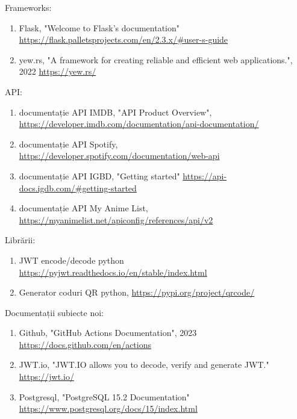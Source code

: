 \documentclass{article}
\begin{document}
\noindent Frameworks:
\begin{enumerate}[noitemsep, leftmargin=0.3cm]
    \item Flask, "Welcome to Flask’s documentation" \href{https://flask.palletsprojects.com/en/2.3.x/#user-s-guide}{https://flask.palletsprojects.com/en/2.3.x/\#user-s-guide}
    \item yew.rs, "A framework for creating reliable and efficient web applications.", 2022 \href{https://yew.rs/}{https://yew.rs/}
\end{enumerate}

\noindent API:
\begin{enumerate}[noitemsep, leftmargin=0.3cm]
\item documentație API IMDB, "API Product Overview", \href{https://developer.imdb.com/documentation/api-documentation/}{https://developer.imdb.com/documentation/api-documentation/} 
    \item documentație API Spotify, \href{https://developer.spotify.com/documentation/web-api}{https://developer.spotify.com/documentation/web-api}
    \item documentație API IGBD, "Getting started" \href{https://api-docs.igdb.com/#getting-started}{https://api-docs.igdb.com/\#getting-started}
    \item documentație API My Anime List, \href{https://myanimelist.net/apiconfig/references/api/v2}{https://myanimelist.net/apiconfig/references/api/v2}
\end{enumerate}

\noindent Librării:
\begin{enumerate}[noitemsep, leftmargin=0.3cm]
    \item JWT encode/decode python \href{https://pyjwt.readthedocs.io/en/stable/index.html}{https://pyjwt.readthedocs.io/en/stable/index.html}
    \item Generator coduri QR python, \href{https://pypi.org/project/qrcode/}{https://pypi.org/project/qrcode/}
\end{enumerate}

\noindent Documentații subiecte noi:
\begin{enumerate}[itemsep=0.1ex,parsep=0.1ex,leftmargin=0.3cm]
    \item Github, "GitHub Actions Documentation", 2023 \href{https://docs.github.com/en/actions}{https://docs.github.com/en/actions}
    \item JWT.io, "JWT.IO allows you to decode, verify and generate JWT." \href{https://jwt.io/}{https://jwt.io/} 
    \item Postgresql, "PostgreSQL 15.2 Documentation" \href{https://www.postgresql.org/docs/15/index.html}{https://www.postgresql.org/docs/15/index.html}
\end{enumerate}
\end{document}
